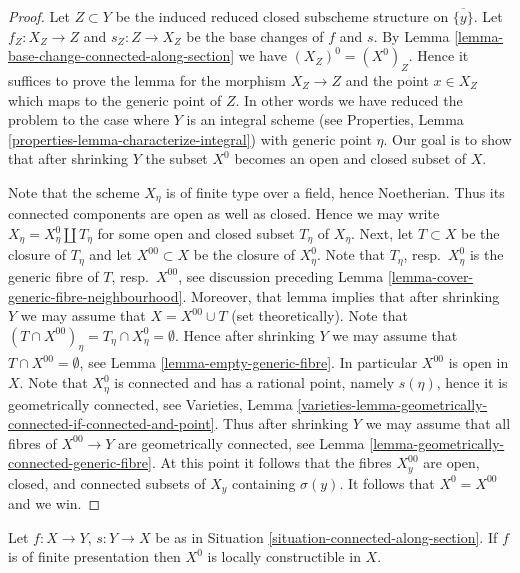 \begin{proof}
Let $Z \subset Y$ be the induced reduced closed subscheme
structure on $\overline{\{y\}}$. Let $f_Z : X_Z \to Z$ and $s_Z : Z \to X_Z$
be the base changes of $f$ and $s$. By
Lemma \ref{lemma-base-change-connected-along-section}
we have $(X_Z)^0 = (X^0)_Z$. Hence it suffices to prove the lemma for
the morphism $X_Z \to Z$ and the point $x \in X_Z$ which maps to the generic
point of $Z$. In other words we have reduced the problem to the case
where $Y$ is an integral scheme (see
Properties, Lemma \ref{properties-lemma-characterize-integral})
with generic point $\eta$. Our goal is to show that after shrinking
$Y$ the subset $X^0$ becomes an open and closed subset of $X$.

\medskip\noindent
Note that the scheme $X_\eta$ is of finite type over a field, hence Noetherian.
Thus its connected components are open as well as closed. Hence we may write
$X_\eta = X_\eta^0 \amalg T_\eta$ for some open and closed subset
$T_\eta$ of $X_\eta$. Next, let $T \subset X$ be the closure of $T_\eta$
and let $X^{00} \subset X$ be the closure of $X_\eta^0$. Note that
$T_\eta$, resp.\ $X^0_\eta$ is the generic fibre of $T$, resp.\ $X^{00}$,
see discussion preceding
Lemma \ref{lemma-cover-generic-fibre-neighbourhood}.
Moreover, that lemma implies that after shrinking $Y$ we may assume that
$X = X^{00} \cup T$ (set theoretically).
Note that $(T \cap X^{00})_\eta = T_\eta \cap X^0_\eta = \emptyset$.
Hence after shrinking $Y$ we may assume that $T \cap X^{00} = \emptyset$, see
Lemma \ref{lemma-empty-generic-fibre}.
In particular $X^{00}$ is open in $X$. Note that $X^0_\eta$ is connected
and has a rational point, namely $s(\eta)$, hence it is geometrically
connected, see
Varieties,
Lemma \ref{varieties-lemma-geometrically-connected-if-connected-and-point}.
Thus after shrinking $Y$ we may assume that all fibres of $X^{00} \to Y$
are geometrically connected, see
Lemma \ref{lemma-geometrically-connected-generic-fibre}.
At this point it follows that the fibres $X^{00}_y$ are
open, closed, and connected subsets of $X_y$ containing $\sigma(y)$.
It follows that $X^0 = X^{00}$ and we win.
\end{proof}

\begin{lemma}
\label{lemma-connected-along-section-locally-constructible}
Let $f : X \to Y$, $s : Y \to X$ be as in
Situation \ref{situation-connected-along-section}.
If $f$ is of finite presentation then $X^0$ is locally constructible
in $X$.
\end{lemma}


